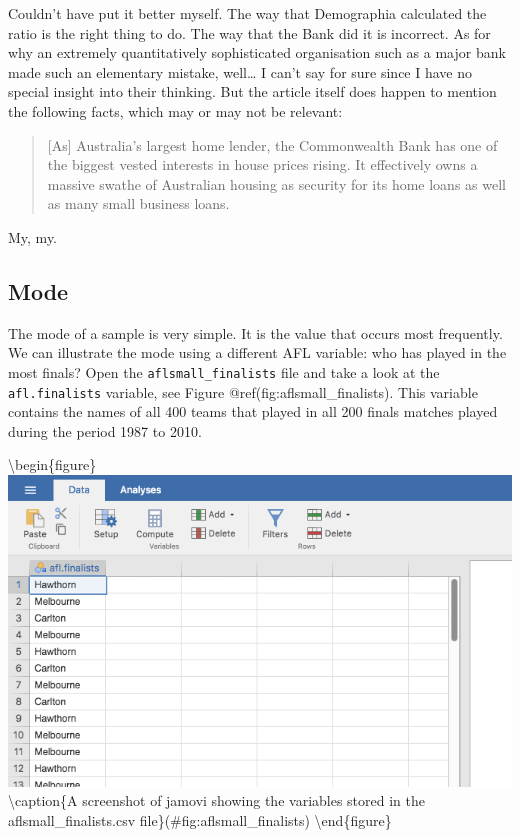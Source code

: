 \documentclass[
]{book}
\begin{document}
Couldn't have put it better myself. The way that Demographia calculated the ratio is the right thing to do. The way that the Bank did it is incorrect. As for why an extremely quantitatively sophisticated organisation such as a major bank made such an elementary mistake, well\ldots{} I can't say for sure since I have no special insight into their thinking. But the article itself does happen to mention the following facts, which may or may not be relevant:

\begin{quote}
{[}As{]} Australia's largest home lender, the Commonwealth Bank has one of the biggest vested interests in house prices rising. It effectively owns a massive swathe of Australian housing as security for its home loans as well as many small business loans.
\end{quote}

My, my.

\hypertarget{mode}{%
\subsection{Mode}\label{mode}}

The mode of a sample is very simple. It is the value that occurs most frequently. We can illustrate the mode using a different AFL variable: who has played in the most finals? Open the \texttt{aflsmall\_finalists} file and take a look at the \texttt{afl.finalists} variable, see Figure @ref(fig:aflsmall\_finalists). This variable contains the names of all 400 teams that played in all 200 finals matches played during the period 1987 to 2010.

\textbackslash begin\{figure\}
\includegraphics[width=9.24in]{img/descriptives/aflsmall_finalists} \textbackslash caption\{A screenshot of jamovi showing the variables stored in the aflsmall\_finalists.csv file\}(\#fig:aflsmall\_finalists)
\textbackslash end\{figure\}
\end{document}
